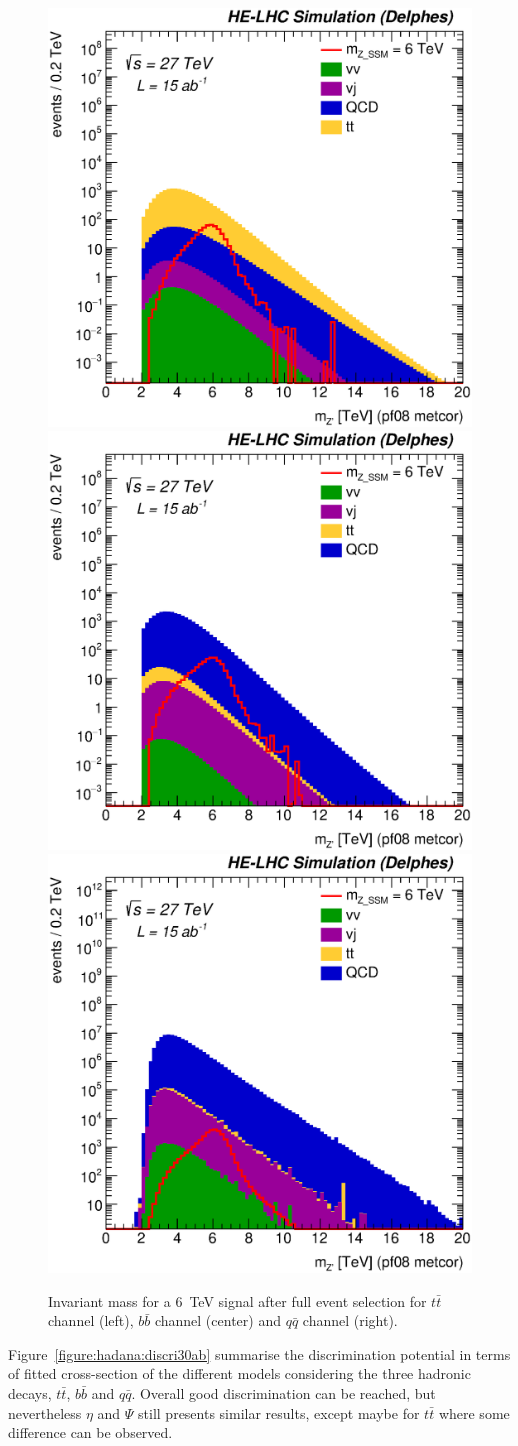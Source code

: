 \begin{figure}[h]
  \centering
  \includegraphics[width=0.30\columnwidth]{Fig/27tev/Mj1j2_pf08_MetCorr_fit_sel0_nostack_log_tt.eps}
  \includegraphics[width=0.30\columnwidth]{Fig/27tev/Mj1j2_pf08_MetCorr_fit_sel0_nostack_log_bb.eps}
  \includegraphics[width=0.30\columnwidth]{Fig/27tev/Mj1j2_pf08_MetCorr_fit_sel0_nostack_log_jj.eps}
  \caption{Invariant mass for a 6~TeV signal after full event selection for $t\bar{t}$ channel (left), $b\bar{b}$ channel (center) and $q\bar{q}$ channel (right). }
  \label{figure:hadronicresonances:masses}
\end{figure}

Figure~\ref{figure:hadana:discri30ab} summarise the discrimination potential in terms of fitted cross-section of the different models considering the three hadronic decays, $t\bar{t}$,  $b\bar{b}$ and $q\bar{q}$. 
Overall good discrimination can be reached, but nevertheless $\eta$ and $\Psi$ still presents similar results, except maybe for $t\bar{t}$ where some difference can be observed.


